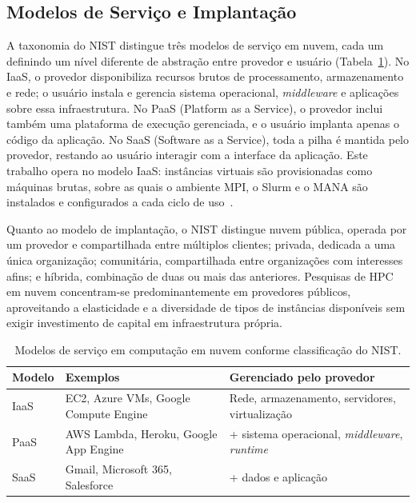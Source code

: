 \subsection{Modelos de Serviço e Implantação}
\label{sec:cloud-modelos}

A taxonomia do NIST distingue três modelos de serviço em nuvem, cada um definindo
um nível diferente de abstração entre provedor e usuário
(Tabela~\ref{tab:service-models}). No IaaS, o provedor disponibiliza recursos
brutos de processamento, armazenamento e rede; o usuário instala e gerencia sistema
operacional, \textit{middleware} e aplicações sobre essa infraestrutura. No PaaS
(Platform as a Service), o provedor inclui também uma plataforma de execução
gerenciada, e o usuário implanta apenas o código da aplicação. No SaaS (Software as
a Service), toda a pilha é mantida pelo provedor, restando ao usuário interagir com
a interface da aplicação. Este trabalho opera no modelo IaaS: instâncias virtuais são
provisionadas como máquinas brutas, sobre as quais o ambiente MPI, o Slurm e o MANA
são instalados e configurados a cada ciclo de uso~\cite{mell2011nist}.

Quanto ao modelo de implantação, o NIST distingue nuvem pública, operada por um
provedor e compartilhada entre múltiplos clientes; privada, dedicada a uma única
organização; comunitária, compartilhada entre organizações com interesses afins; e
híbrida, combinação de duas ou mais das anteriores. Pesquisas de HPC em nuvem
concentram-se predominantemente em provedores públicos, aproveitando a elasticidade
e a diversidade de tipos de instâncias disponíveis sem exigir investimento de capital
em infraestrutura própria.

\begin{table}[htb]
  \centering
  \caption{Modelos de serviço em computação em nuvem conforme classificação do NIST.}
  \label{tab:service-models}
  \begin{tabular}{p{1.8cm}p{5.5cm}p{5.5cm}}
    \toprule
    \textbf{Modelo} & \textbf{Exemplos} & \textbf{Gerenciado pelo provedor} \\
    \midrule
    IaaS & EC2, Azure VMs, Google Compute Engine
         & Rede, armazenamento, servidores, virtualização \\
    PaaS & AWS Lambda, Heroku, Google App Engine
         & + sistema operacional, \textit{middleware}, \textit{runtime} \\
    SaaS & Gmail, Microsoft 365, Salesforce
         & + dados e aplicação \\
    \bottomrule
  \end{tabular}
\end{table}

